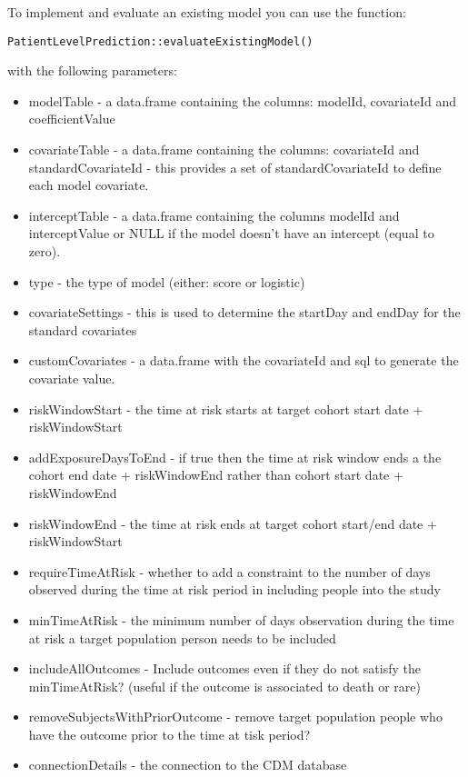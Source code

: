 \documentclass[]{article}
\providecommand{\tightlist}{%
  \setlength{\itemsep}{0pt}\setlength{\parskip}{0pt}}
\begin{document}
To implement and evaluate an existing model you can use the function:

\texttt{PatientLevelPrediction::evaluateExistingModel()}

with the following parameters:

\begin{itemize}
\tightlist
\item
  modelTable - a data.frame containing the columns: modelId, covariateId
  and coefficientValue
\item
  covariateTable - a data.frame containing the columns: covariateId and
  standardCovariateId - this provides a set of standardCovariateId to
  define each model covariate.
\item
  interceptTable - a data.frame containing the columns modelId and
  interceptValue or NULL if the model doesn't have an intercept (equal
  to zero).
\item
  type - the type of model (either: score or logistic)
\item
  covariateSettings - this is used to determine the startDay and endDay
  for the standard covariates
\item
  customCovariates - a data.frame with the covariateId and sql to
  generate the covariate value.
\item
  riskWindowStart - the time at risk starts at target cohort start date
  + riskWindowStart
\item
  addExposureDaysToEnd - if true then the time at risk window ends a the
  cohort end date + riskWindowEnd rather than cohort start date +
  riskWindowEnd
\item
  riskWindowEnd - the time at risk ends at target cohort start/end date
  + riskWindowStart
\item
  requireTimeAtRisk - whether to add a constraint to the number of days
  observed during the time at risk period in including people into the
  study
\item
  minTimeAtRisk - the minimum number of days observation during the time
  at risk a target population person needs to be included
\item
  includeAllOutcomes - Include outcomes even if they do not satisfy the
  minTimeAtRisk? (useful if the outcome is associated to death or rare)
\item
  removeSubjectsWithPriorOutcome - remove target population people who
  have the outcome prior to the time at tisk period?
\item
  connectionDetails - the connection to the CDM database
\end{itemize}
\end{document}
